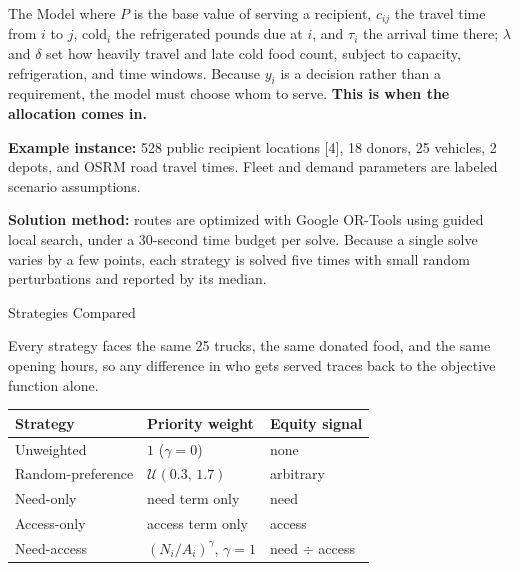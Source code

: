 \documentclass[final]{beamer}
\newlength{\colwidth}
\begin{document}
\begin{frame}[t]
\begin{columns}[t]
\begin{column}{\colwidth}
\begin{block}{The Model}
    where $P$ is the base value of serving a recipient, $c_{ij}$ the travel time
    from $i$ to $j$, $\mathrm{cold}_i$ the refrigerated pounds due at $i$, and
    $\tau_i$ the arrival time there; $\lambda$ and $\delta$ set how heavily travel
    and late cold food count, subject to capacity, refrigeration, and time
    windows. Because $y_i$
    is a decision rather than a requirement, the model must choose whom to serve.
    \textbf{This is when the allocation comes in.}

    \textbf{Example instance:} 528 public recipient locations [4], 18 donors,
    25 vehicles, 2 depots, and OSRM road travel times. Fleet and demand
    parameters are labeled scenario assumptions.

    \textbf{Solution method:} routes are optimized with Google OR-Tools using
    guided local search, under a 30-second time budget per solve. Because a single
    solve varies by a few points, each strategy is solved five times with small random perturbations and reported by its median.

  \end{block}

\vspace{0.5em}

  \begin{block}{Strategies Compared}

    Every strategy faces the same 25 trucks, the same donated food, and the same opening
    hours, so any difference in who gets served traces back to the objective function alone.

    \begin{table}
      \centering
      \normalsize
      \begin{tabular*}{\linewidth}{@{\extracolsep{\fill}}lll@{}}
        \toprule
        \textbf{Strategy} & \textbf{Priority weight} & \textbf{Equity signal} \\
        \midrule
        Unweighted        & $1$ \;($\gamma = 0$)            & none \\
        Random-preference & $\mathcal{U}(0.3,\,1.7)$        & arbitrary \\
        Need-only         & need term only                  & need \\
        Access-only       & access term only                & access \\
        Need-access       & $(N_i/A_i)^{\gamma}$, $\gamma = 1$ & need $\div$ access \\
        \bottomrule
      \end{tabular*}
    \end{table}


\end{block}
\end{column}
\end{columns}
\end{frame}
\end{document}
